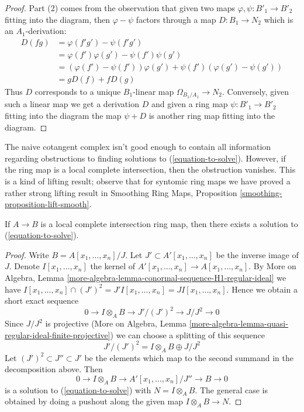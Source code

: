 \begin{proof}
\medskip\noindent
Part (2) comes from the observation that given two maps
$\varphi, \psi : B'_1 \to B'_2$ fitting into the diagram, then
$\varphi - \psi$ factors through a map $D : B_1 \to N_2$ which
is an $A_1$-derivation:
\begin{align*}
D(fg) & = \varphi(f'g') - \psi(f'g') \\
& =
\varphi(f')\varphi(g') - \psi(f')\psi(g') \\
& =
(\varphi(f') - \psi(f'))\varphi(g') + \psi(f')(\varphi(g') - \psi(g')) \\
& =
gD(f) + fD(g)
\end{align*}
Thus $D$ corresponds to a unique $B_1$-linear map
$\Omega_{B_1/A_1} \to N_2$. Conversely, given such a linear map
we get a derivation $D$ and given a ring map $\psi : B'_1 \to B'_2$
fitting into the diagram
the map $\psi + D$ is another ring map fitting into the diagram.
\end{proof}

\noindent
The naive cotangent complex isn't good enough to contain all information
regarding obstructions to finding solutions to (\ref{equation-to-solve}).
However, if the ring map is a local complete intersection, then the
obstruction vanishes. This is a kind of lifting result; observe that
for syntomic ring maps we have proved a rather strong lifting result in
Smoothing Ring Maps, Proposition \ref{smoothing-proposition-lift-smooth}.

\begin{lemma}
\label{lemma-existence-lci}
If $A \to B$ is a local complete intersection ring map, then
there exists a solution to (\ref{equation-to-solve}).
\end{lemma}

\begin{proof}
Write $B = A[x_1, \ldots, x_n]/J$. Let $J' \subset A'[x_1, \ldots, x_n]$
be the inverse image of $J$. Denote $I[x_1, \ldots, x_n]$ the
kernel of $A'[x_1, \ldots, x_n] \to A[x_1, \ldots, x_n]$.
By More on Algebra, Lemma
\ref{more-algebra-lemma-conormal-sequence-H1-regular-ideal} we have
$I[x_1, \ldots, x_n] \cap (J')^2 = J'I[x_1, \ldots, x_n] =
JI[x_1, \ldots, x_n]$. Hence we obtain a short exact sequence
$$
0 \to I \otimes_A B \to J'/(J')^2 \to J/J^2 \to 0
$$
Since $J/J^2$ is projective (More on Algebra, Lemma
\ref{more-algebra-lemma-quasi-regular-ideal-finite-projective})
we can choose a splitting of this sequence
$$
J'/(J')^2 = I \otimes_A B \oplus J/J^2 
$$
Let $(J')^2 \subset J'' \subset J'$ be the elements which map to the
second summand in the decomposition above. Then
$$
0 \to I \otimes_A B \to A'[x_1, \ldots, x_n]/J'' \to B \to 0
$$
is a solution to (\ref{equation-to-solve}) with $N = I \otimes_A B$.
The general case is obtained by doing a pushout along the given
map $I \otimes_A B \to N$.
\end{proof}

